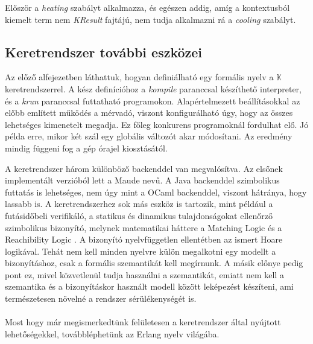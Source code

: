 

Először a \textit{heating} szabályt alkalmazza, és egészen addig, amíg a kontextusból kiemelt term nem \textit{KResult} fajtájú, nem tudja alkalmazni rá a \textit{cooling} szabályt.

\subsection{Keretrendszer további eszközei}

Az előző alfejezetben láthattuk, hogyan definiálható egy formális nyelv a $\mathbb{K}$ keretrendszerrel. A kész definícióhoz a \textit{kompile} paranccsal készíthető interpreter, és a \textit{krun} paranccsal futtatható programokon. Alapértelmezett beállításokkal az előbb említett működés a mérvadó, viszont konfigurálható úgy, hogy az összes lehetséges kimenetelt megadja. Ez főleg konkurens programoknál fordulhat elő. Jó példa erre, mikor két szál egy globális változót akar módosítani. Az eredmény mindig függeni fog a gép órajel kiosztásától.

A keretrendszer három különböző backenddel van megvalósítva. Az elsőnek implementált verzióból lett a Maude nevű. A Java backenddel szimbolikus futtatás is lehetséges, nem úgy mint a OCaml backenddel, viszont hátránya, hogy lassabb is. A keretrendszerhez sok más eszköz is tartozik, mint például a futásidőbeli verifikáló, a statikus és dinamikus tulajdonságokat ellenőrző szimbolikus bizonyító, melynek matematikai háttere a Matching Logic \cite{MatchLog} és a Reachibility Logic \cite{ReachLog}. A bizonyító nyelvfüggetlen ellentétben az ismert Hoare logikával. Tehát nem kell minden nyelvre külön megalkotni egy modellt a bizonyításhoz, csak a formális szemantikát kell megírnunk. A másik előnye pedig pont ez, mivel közvetlenül tudja használni a szemantikát, emiatt nem kell a szemantika és a bizonyításkor használt modell között leképezést készíteni, ami természetesen növelné a rendszer sérülékenységét is.

\paragraph{}
Most hogy már megismerkedtünk felületesen a keretrendszer által nyújtott lehetőségekkel, továbbléphetünk az Erlang nyelv világába.

